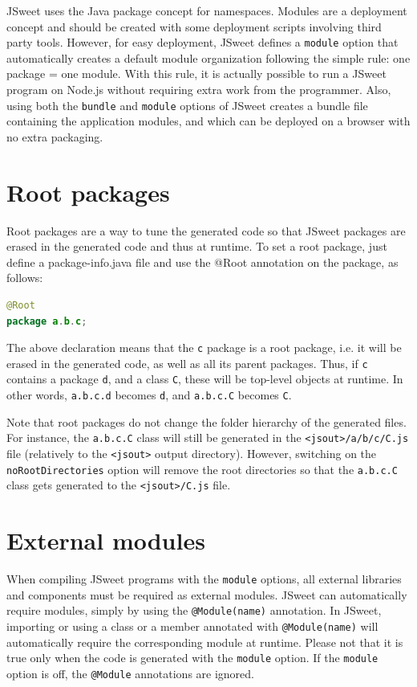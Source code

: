 \documentclass[a4paper]{report}
\begin{document}
JSweet uses the Java package concept for namespaces. Modules are a deployment concept and should be created with some deployment scripts involving third party tools. However, for easy deployment, JSweet defines a \texttt{module} option that automatically creates a default module organization following the simple rule: one package = one module. With this rule, it is actually possible to run a JSweet program on Node.js without requiring extra work from the programmer. Also, using both the \texttt{bundle} and \texttt{module} options of JSweet creates a bundle file containing the application modules, and which can be deployed on a browser with no extra packaging.

\section{Root packages}

Root packages are a way to tune the generated code so that JSweet packages are erased in the generated code and thus at runtime. To set a root package, just define a package-info.java file and use the @Root annotation on the package, as follows:

\begin{lstlisting}[language=Java]
@Root
package a.b.c;
\end{lstlisting}

The above declaration means that the \texttt{c} package is a root package, i.e. it will be erased in the generated code, as well as all its parent packages. Thus, if \texttt{c} contains a package \texttt{d}, and a class \texttt{C}, these will be top-level objects at runtime. In other words, \texttt{a.b.c.d} becomes \texttt{d}, and \texttt{a.b.c.C} becomes \texttt{C}.

Note that root packages do not change the folder hierarchy of the generated files. For instance, the \texttt{a.b.c.C} class will still be generated in the \texttt{<jsout>/a/b/c/C.js} file (relatively to the \texttt{<jsout>} output directory). However, switching on the \texttt{noRootDirectories} option will remove the root directories so that the \texttt{a.b.c.C} class gets generated to the \texttt{<jsout>/C.js} file.

\section{External modules}

When compiling JSweet programs with the \texttt{module} options, all external libraries and components must be required as external modules. JSweet can automatically require modules, simply by using the \texttt{@Module(name)} annotation. In JSweet, importing or using a class or a member annotated with \texttt{@Module(name)} will automatically require the corresponding module at runtime. Please not that it is true only when the code is generated with the \texttt{module} option. If the \texttt{module} option is off, the \texttt{@Module} annotations are ignored.
\end{document}
